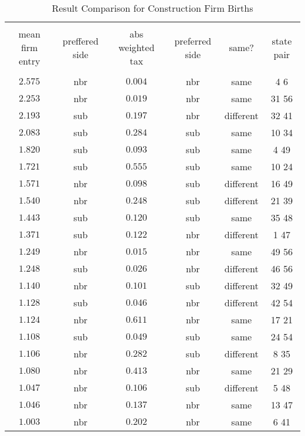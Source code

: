 
\begin{table}[!htbp] \centering 
  \caption{Result Comparison for Construction Firm Births} 
  \label{} 
\small 
\begin{tabular}{@{\extracolsep{5pt}} cccccc} 
\\[-1.8ex]\hline 
\hline \\[-1.8ex] 
mean firm entry & preffered side & abs weighted tax & preferred side & same? & state pair \\ 
\hline \\[-1.8ex] 
$2.575$ & nbr & $0.004$ & nbr & same & 4 6  \\ 
$2.253$ & nbr & $0.019$ & nbr & same & 31 56  \\ 
$2.193$ & sub & $0.197$ & nbr & different & 32 41  \\ 
$2.083$ & sub & $0.284$ & sub & same & 10 34  \\ 
$1.820$ & sub & $0.093$ & sub & same & 4 49  \\ 
$1.721$ & sub & $0.555$ & sub & same & 10 24  \\ 
$1.571$ & nbr & $0.098$ & sub & different & 16 49  \\ 
$1.540$ & nbr & $0.248$ & sub & different & 21 39  \\ 
$1.443$ & sub & $0.120$ & sub & same & 35 48  \\ 
$1.371$ & sub & $0.122$ & nbr & different & 1 47  \\ 
$1.249$ & nbr & $0.015$ & nbr & same & 49 56  \\ 
$1.248$ & sub & $0.026$ & nbr & different & 46 56  \\ 
$1.140$ & nbr & $0.101$ & sub & different & 32 49  \\ 
$1.128$ & sub & $0.046$ & nbr & different & 42 54  \\ 
$1.124$ & nbr & $0.611$ & nbr & same & 17 21  \\ 
$1.108$ & sub & $0.049$ & sub & same & 24 54  \\ 
$1.106$ & nbr & $0.282$ & sub & different & 8 35  \\ 
$1.080$ & nbr & $0.413$ & nbr & same & 21 29  \\ 
$1.047$ & nbr & $0.106$ & sub & different & 5 48  \\ 
$1.046$ & nbr & $0.137$ & nbr & same & 13 47  \\ 
$1.003$ & nbr & $0.202$ & nbr & same & 6 41  \\ 

\end{tabular}
\end{table}
